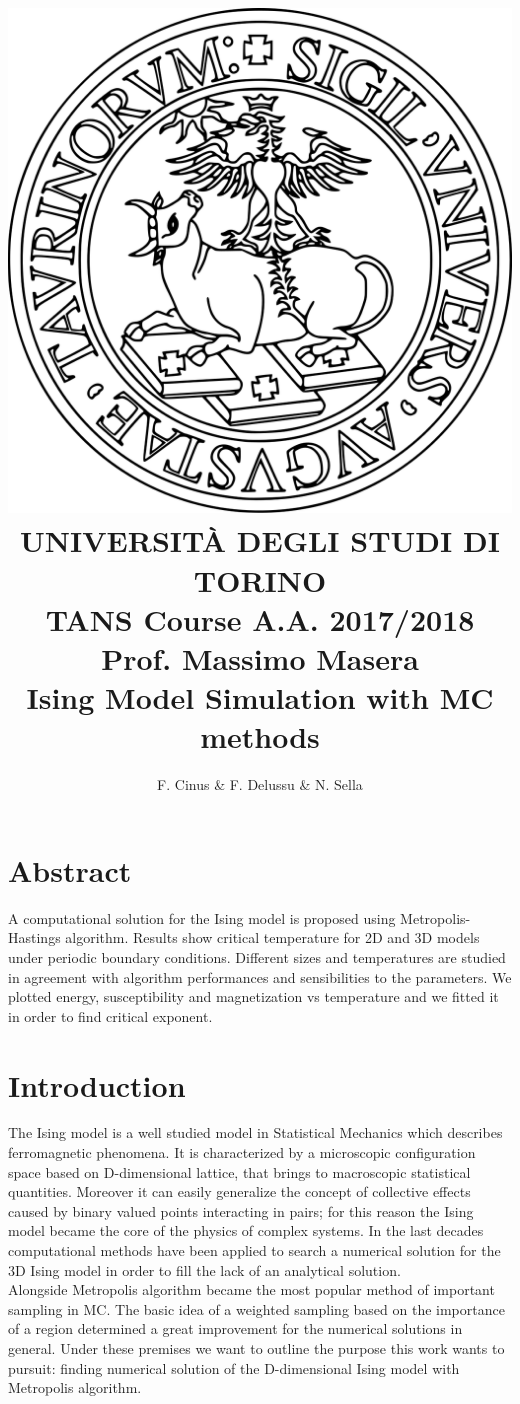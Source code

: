 \documentclass[11pt,a4paper]{article}
\author{F. Cinus \& F. Delussu \& N. Sella}
\title{\includegraphics[scale=0.12]{Unito-logo} \\ \LARGE{UNIVERSIT\`{A} DEGLI STUDI DI TORINO}
  \\
  TANS Course A.A. 2017/2018 Prof. Massimo Masera
  \\
  \textbf{Ising Model Simulation with MC methods}
}
\begin{document}
\date{}
\maketitle
\bigskip
\section*{Abstract}
A computational solution for the Ising model is proposed using Metropolis-Hastings algorithm. Results show critical temperature for 2D and 3D models under periodic boundary conditions. Different sizes and temperatures are studied in agreement with algorithm performances and sensibilities to the parameters. We plotted energy, susceptibility and magnetization vs temperature and we fitted it in order to find critical exponent.


\newpage
\section*{Introduction}
The Ising model is a well studied model in Statistical Mechanics which describes ferromagnetic phenomena. It is characterized by a microscopic configuration space based on D-dimensional lattice, that brings to macroscopic statistical quantities. Moreover it can easily generalize the concept of collective effects caused by binary valued points interacting in pairs; for this reason the Ising model became the core of the physics of complex systems. In the last decades computational methods have been applied to search a numerical solution for the 3D Ising model in order to  fill the lack of an analytical solution.
\\
Alongside Metropolis algorithm became the most popular method of important sampling in MC. The basic idea of a weighted sampling based on the importance of a region determined a great improvement for the numerical solutions in general. Under these premises we want to outline the purpose this work wants to pursuit: finding numerical solution of the D-dimensional Ising model with Metropolis algorithm.
\end{document}

